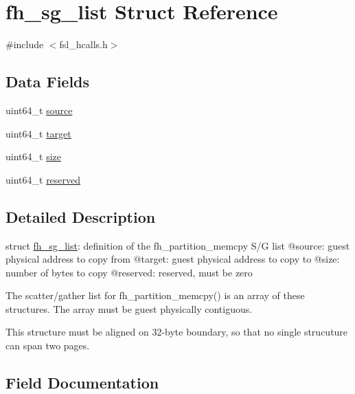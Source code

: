 \hypertarget{structfh__sg__list}{}\section{fh\+\_\+sg\+\_\+list Struct Reference}
\label{structfh__sg__list}


{\ttfamily \#include $<$fsl\+\_\+hcalls.\+h$>$}

\subsection*{Data Fields}
\begin{DoxyCompactItemize}
\item 
uint64\+\_\+t \mbox{\hyperlink{structfh__sg__list_a4eb47bcfd3fda820c8d3c178700b12f5}{source}}
\item 
uint64\+\_\+t \mbox{\hyperlink{structfh__sg__list_ad54786fd1a430df2d643b6d6561941a5}{target}}
\item 
uint64\+\_\+t \mbox{\hyperlink{structfh__sg__list_a79cd752dd375fed24e391bf2ffa47e59}{size}}
\item 
uint64\+\_\+t \mbox{\hyperlink{structfh__sg__list_a8f01e25bdc46fa402d022452120fa880}{reserved}}
\end{DoxyCompactItemize}


\subsection{Detailed Description}
struct \mbox{\hyperlink{structfh__sg__list}{fh\+\_\+sg\+\_\+list}}\+: definition of the fh\+\_\+partition\+\_\+memcpy S/G list @source\+: guest physical address to copy from @target\+: guest physical address to copy to @size\+: number of bytes to copy @reserved\+: reserved, must be zero

The scatter/gather list for fh\+\_\+partition\+\_\+memcpy() is an array of these structures. The array must be guest physically contiguous.

This structure must be aligned on 32-\/byte boundary, so that no single strucuture can span two pages. 

\subsection{Field Documentation}
\mbox{\label{structfh__sg__list_a8f01e25bdc46fa402d022452120fa880}} 
